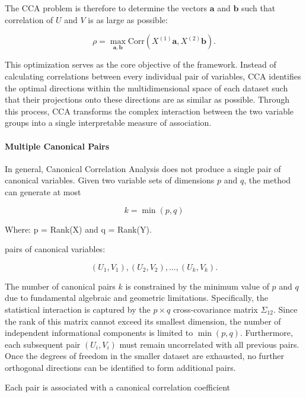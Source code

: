 The CCA problem is therefore to determine the vectors $\mathbf{a}$ and $\mathbf{b}$ such that correlation of $U$ and $V$ is as large as possible:

\begin{equation}
\rho = 
\max_{\mathbf{a},\mathbf{b}}
\text{Corr}(X^{(1)}\mathbf{a}, X^{(2)}\mathbf{b}).
\end{equation}

This optimization serves as the core objective of the framework. Instead of calculating correlations between every individual pair of variables, CCA identifies the optimal directions within the multidimensional space of each dataset such that their projections onto these directions are as similar as possible. Through this process, CCA transforms the complex interaction between the two variable groups into a single interpretable measure of association.
\paragraph{Multiple Canonical Pairs}


In general, Canonical Correlation Analysis does not produce a single pair of canonical variables. 
Given two variable sets of dimensions $p$ and $q$, the method can generate at most

\begin{equation}
k = \min(p, q)
\end{equation}

Where: p = Rank(X) and q = Rank(Y).

pairs of canonical variables:

\begin{equation}
(U_1,V_1), (U_2,V_2), \dots, (U_k,V_k).
\end{equation}

The number of canonical pairs $k$ is constrained by the minimum value of $p$ and $q$ due to fundamental algebraic and geometric limitations. Specifically, the statistical interaction is captured by the $p \times q$ cross-covariance matrix $\Sigma_{12}$. Since the rank of this matrix cannot exceed its smallest dimension, the number of independent informational components is limited to $\min(p, q)$. Furthermore, each subsequent pair $(U_i, V_i)$ must remain uncorrelated with all previous pairs. Once the degrees of freedom in the smaller dataset are exhausted, no further orthogonal directions can be identified to form additional pairs.

Each pair is associated with a canonical correlation coefficient

